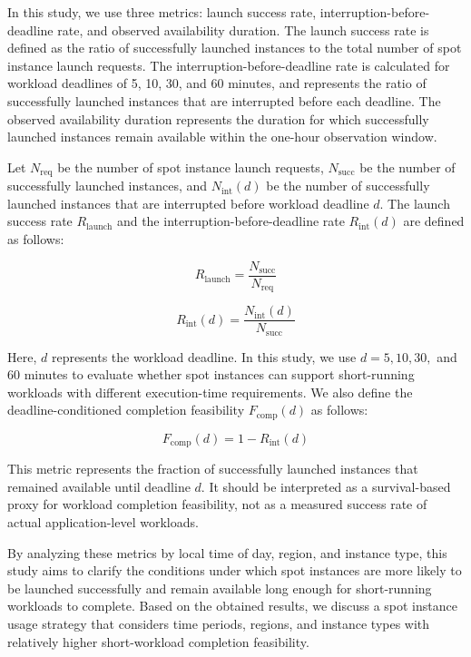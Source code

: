 \documentclass[runningheads]{llncs}
\begin{document}
In this study, we use three metrics: launch success rate, interruption-before-deadline rate, and observed availability duration. The launch success rate is defined as the ratio of successfully launched instances to the total number of spot instance launch requests. The interruption-before-deadline rate is calculated for workload deadlines of 5, 10, 30, and 60 minutes, and represents the ratio of successfully launched instances that are interrupted before each deadline. The observed availability duration represents the duration for which successfully launched instances remain available within the one-hour observation window.

Let $N_{\mathrm{req}}$ be the number of spot instance launch requests, $N_{\mathrm{succ}}$ be the number of successfully launched instances, and $N_{\mathrm{int}}(d)$ be the number of successfully launched instances that are interrupted before workload deadline $d$. The launch success rate $R_{\mathrm{launch}}$ and the interruption-before-deadline rate $R_{\mathrm{int}}(d)$ are defined as follows:

\begin{equation}
R_{\mathrm{launch}} = \frac{N_{\mathrm{succ}}}{N_{\mathrm{req}}}
\end{equation}

\begin{equation}
R_{\mathrm{int}}(d) = \frac{N_{\mathrm{int}}(d)}{N_{\mathrm{succ}}}
\end{equation}

Here, $d$ represents the workload deadline. In this study, we use $d = 5, 10, 30,$ and $60$ minutes to evaluate whether spot instances can support short-running workloads with different execution-time requirements. We also define the deadline-conditioned completion feasibility $F_{\mathrm{comp}}(d)$ as follows:

\begin{equation}
F_{\mathrm{comp}}(d) = 1 - R_{\mathrm{int}}(d)
\end{equation}

This metric represents the fraction of successfully launched instances that remained available until deadline $d$. It should be interpreted as a survival-based proxy for workload completion feasibility, not as a measured success rate of actual application-level workloads.

By analyzing these metrics by local time of day, region, and instance type, this study aims to clarify the conditions under which spot instances are more likely to be launched successfully and remain available long enough for short-running workloads to complete. Based on the obtained results, we discuss a spot instance usage strategy that considers time periods, regions, and instance types with relatively higher short-workload completion feasibility.
\end{document}
